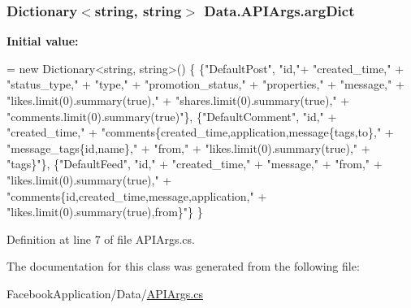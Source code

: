 \subsubsection[{\texorpdfstring{arg\+Dict}{argDict}}]{\setlength{\rightskip}{0pt plus 5cm}Dictionary$<$string, string$>$ Data.\+A\+P\+I\+Args.\+arg\+Dict}\hypertarget{class_data_1_1_a_p_i_args_a86541aeaf3d536fa12c75ac1eb404807}{}\label{class_data_1_1_a_p_i_args_a86541aeaf3d536fa12c75ac1eb404807}
{\bfseries Initial value\+:}
\begin{DoxyCode}
= \textcolor{keyword}{new} Dictionary<string, string>()
        \{
            \{\textcolor{stringliteral}{"DefaultPost"}, \textcolor{stringliteral}{"id,"}+
                            \textcolor{stringliteral}{"created\_time,"} +
                            \textcolor{stringliteral}{"status\_type,"} +
                            \textcolor{stringliteral}{"type,"} +
                            \textcolor{stringliteral}{"promotion\_status,"} +
                            \textcolor{stringliteral}{"properties,"} +
                            \textcolor{stringliteral}{"message,"} +
                            \textcolor{stringliteral}{"likes.limit(0).summary(true),"} +
                            \textcolor{stringliteral}{"shares.limit(0).summary(true),"} +
                            \textcolor{stringliteral}{"comments.limit(0).summary(true)"}\},
            \{\textcolor{stringliteral}{"DefaultComment"}, \textcolor{stringliteral}{"id,"} +
                \textcolor{stringliteral}{"created\_time,"} +
                \textcolor{stringliteral}{"comments\{created\_time,application,message\{tags,to\},"} +
                \textcolor{stringliteral}{"message\_tags\{id,name\},"} +
                \textcolor{stringliteral}{"from,"} +
                \textcolor{stringliteral}{"likes.limit(0).summary(true),"} +
                \textcolor{stringliteral}{"tags\}"}\},
            \{\textcolor{stringliteral}{"DefaultFeed"}, \textcolor{stringliteral}{"id,"} +
                \textcolor{stringliteral}{"created\_time,"} +
                \textcolor{stringliteral}{"message,"} +
                \textcolor{stringliteral}{"from,"} +
                \textcolor{stringliteral}{"likes.limit(0).summary(true),"} +
                \textcolor{stringliteral}{"comments\{id,created\_time,message,application,"} +
                \textcolor{stringliteral}{"likes.limit(0).summary(true),from\}"}\}
        \}
\end{DoxyCode}


Definition at line 7 of file A\+P\+I\+Args.\+cs.



The documentation for this class was generated from the following file\+:\begin{DoxyCompactItemize}
\item 
Facebook\+Application/\+Data/\hyperlink{_a_p_i_args_8cs}{A\+P\+I\+Args.\+cs}\end{DoxyCompactItemize}
